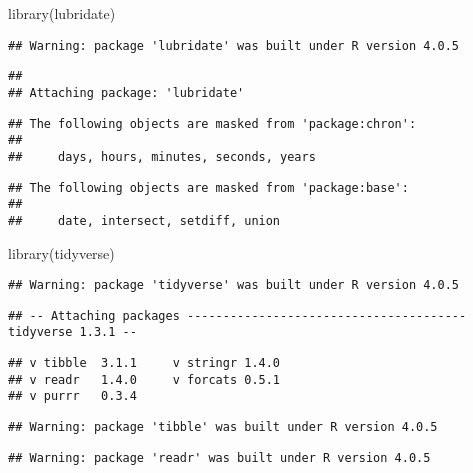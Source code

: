\documentclass[
]{article}
\newenvironment{Shaded}{\begin{snugshade}}{\end{snugshade}}
\newcommand{\FunctionTok}[1]{\textcolor[rgb]{0.00,0.00,0.00}{#1}}
\newcommand{\NormalTok}[1]{#1}
\begin{document}
\begin{Shaded}
\begin{Highlighting}[]
\FunctionTok{library}\NormalTok{(lubridate)}
\end{Highlighting}
\end{Shaded}

\begin{verbatim}
## Warning: package 'lubridate' was built under R version 4.0.5
\end{verbatim}

\begin{verbatim}
## 
## Attaching package: 'lubridate'
\end{verbatim}

\begin{verbatim}
## The following objects are masked from 'package:chron':
## 
##     days, hours, minutes, seconds, years
\end{verbatim}

\begin{verbatim}
## The following objects are masked from 'package:base':
## 
##     date, intersect, setdiff, union
\end{verbatim}

\begin{Shaded}
\begin{Highlighting}[]
\FunctionTok{library}\NormalTok{(tidyverse)}
\end{Highlighting}
\end{Shaded}

\begin{verbatim}
## Warning: package 'tidyverse' was built under R version 4.0.5
\end{verbatim}

\begin{verbatim}
## -- Attaching packages --------------------------------------- tidyverse 1.3.1 --
\end{verbatim}

\begin{verbatim}
## v tibble  3.1.1     v stringr 1.4.0
## v readr   1.4.0     v forcats 0.5.1
## v purrr   0.3.4
\end{verbatim}

\begin{verbatim}
## Warning: package 'tibble' was built under R version 4.0.5
\end{verbatim}

\begin{verbatim}
## Warning: package 'readr' was built under R version 4.0.5
\end{verbatim}
\end{document}
